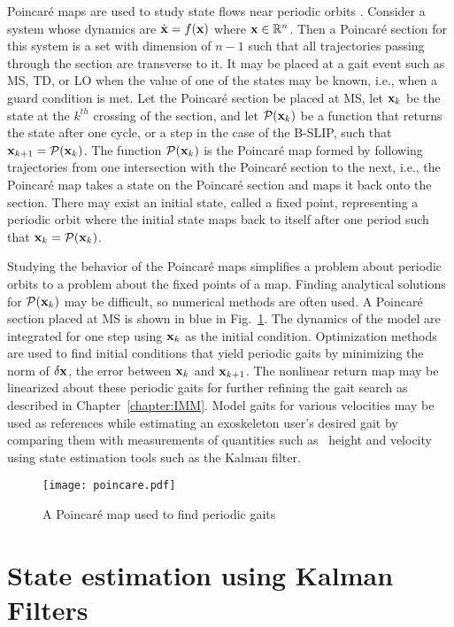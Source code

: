 Poincar\'e maps are used to study state flows near periodic orbits \cite{strogatz2018nonlinear}. Consider a system whose dynamics are $ \dot{\mathbf{x}} = f(\mathbf{x}) $ where $ \mathbf{x} \in \mathbb{R}^n $. Then a  Poincar\'e section for this system is a set with dimension of $ n-1 $ such that all trajectories passing through the section are transverse to it. It may be placed at a gait event such as MS, TD, or LO when the value of one of the states may be known, i.e., when a guard condition is met. Let the Poincar\'e section be placed at MS, let $ \mathbf{x}_k $ be the state at the $ k^{th} $ crossing of the section, and let $ \mathcal{P}(\mathbf{x}_k) $ be a function that returns the state after one cycle, or a step in the case of the B-SLIP, such that $ \mathbf{x}_{k+1} = \mathcal{P}(\mathbf{x}_k) $. The function $ \mathcal{P}(\mathbf{x}_k) $ is the Poincar\'e map formed by following trajectories from one intersection with the Poincar\'e section to the next, i.e., the Poincar\'e map takes a state on the Poincar\'e section and maps it back onto the section. There may exist an initial state, called a fixed point, representing a periodic orbit where the initial state maps back to itself after one period such that $ \mathbf{x}_k = \mathcal{P}(\mathbf{x}_k) $. 

Studying the behavior of the Poincar\'e maps simplifies a problem about periodic orbits to a problem about the fixed points of a map. Finding analytical solutions for $ \mathcal{P}(\mathbf{x}_k) $ may be difficult, so numerical methods are often used. A Poincar\'e section placed at MS is shown in blue in Fig.~\ref{fig:poincare}. The dynamics of the model are integrated for one step using $ \mathbf{x}_k $ as the initial condition. Optimization methods are used to find initial conditions that yield periodic gaits by minimizing the norm of $ \delta \mathbf{x} $, the error between $ \mathbf{x}_k $ and $ \mathbf{x}_{k+1} $. The nonlinear return map may be linearized about these periodic gaits for further refining the gait search as described in Chapter~\ref{chapter:IMM}. Model gaits for various velocities may be used as references while estimating an exoskeleton user's desired gait by comparing them with measurements of quantities such as \COM~height and velocity using state estimation tools such as the Kalman filter. 

\begin{figure}
	\centering
	\texttt{[image: poincare.pdf]}
	\caption{A Poincar\'e map used to find periodic gaits}\label{fig:poincare}
\end{figure}

\section{State estimation using Kalman Filters}\label{sec:estimation}


